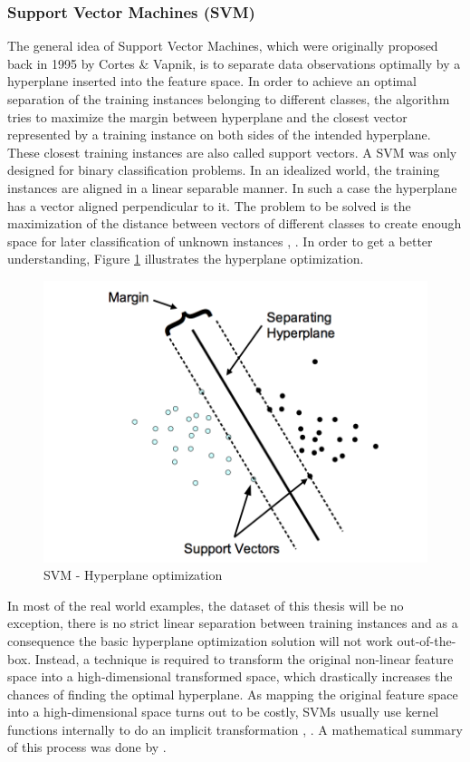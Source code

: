 \subsubsection{Support Vector Machines (SVM)}
The general idea of Support Vector Machines, which were originally proposed back in 1995 by Cortes \& Vapnik, is to separate data observations optimally by a hyperplane inserted into the feature space. In order to achieve an optimal separation of the training instances belonging to different classes, the algorithm tries to maximize the margin between hyperplane and the closest vector represented by a training instance on both sides of the intended hyperplane. These closest training instances are also called support vectors. A SVM was only designed for binary classification problems. In an idealized world, the training instances are aligned in a linear separable manner. In such a case the hyperplane has a vector aligned perpendicular to it. The problem to be solved is the maximization of the distance between vectors of different classes to create enough space for later classification of unknown instances \cite{cortes1995support}, \cite{hearst1998support}. In order to get a better understanding, Figure \ref{fig:svm} illustrates the hyperplane optimization. 

\begin{figure}
	\centering
	\includegraphics[width=1.0\textwidth]{img/svm.png}
	\caption{SVM - Hyperplane optimization \cite{meyer2001support}}
	\label{fig:svm}
\end{figure} 

In most of the real world examples, the dataset of this thesis will be no exception, there is no strict linear separation between training instances and as a consequence the basic hyperplane optimization solution will not work out-of-the-box. Instead, a technique is required to transform the original non-linear feature space into a high-dimensional transformed space, which drastically increases the chances of finding the optimal hyperplane. As mapping the original feature space into a high-dimensional space turns out to be costly, SVMs usually use kernel functions internally to do an implicit transformation \cite{cortes1995support}, \cite{hearst1998support}. A mathematical summary of this process was done by \cite{hearst1998support}. 